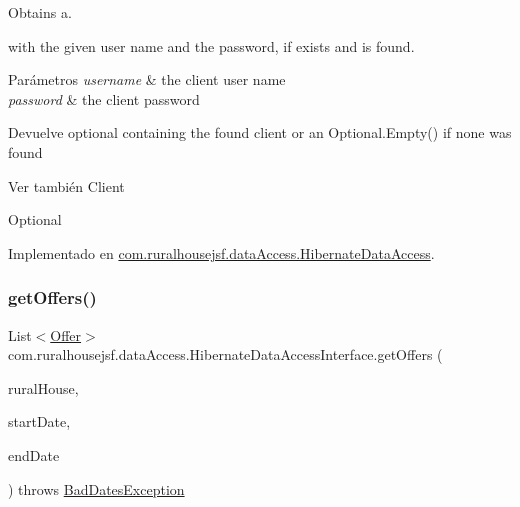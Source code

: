 Obtains a. 


\begin{DoxyCode}{0}
\end{DoxyCode}
 with the given user name and the password, if exists and is found.


\begin{DoxyParams}{Parámetros}
{\em username} & the client user name \\
\hline
{\em password} & the client password\\
\hline
\end{DoxyParams}
\begin{DoxyReturn}{Devuelve}
optional containing the found client or an {\ttfamily Optional.\+Empty()} if none was found
\end{DoxyReturn}
\begin{DoxySeeAlso}{Ver también}
Client 

Optional 
\end{DoxySeeAlso}


Implementado en \mbox{\hyperlink{classcom_1_1ruralhousejsf_1_1data_access_1_1_hibernate_data_access_a6df6a0502595b73be0f6d238743eeda5}{com.\+ruralhousejsf.\+data\+Access.\+Hibernate\+Data\+Access}}.

\mbox{\label{interfacecom_1_1ruralhousejsf_1_1data_access_1_1_hibernate_data_access_interface_a731ab9e6ef26732d453046c9630c677b}} 
\subsubsection{\texorpdfstring{getOffers()}{getOffers()}\hspace{0.1cm}{\footnotesize\ttfamily [1/2]}}
{\footnotesize\ttfamily List$<$\mbox{\hyperlink{classcom_1_1ruralhousejsf_1_1domain_1_1_offer}{Offer}}$>$ com.\+ruralhousejsf.\+data\+Access.\+Hibernate\+Data\+Access\+Interface.\+get\+Offers (\begin{DoxyParamCaption}\item[{\mbox{\hyperlink{classcom_1_1ruralhousejsf_1_1domain_1_1_rural_house}{Rural\+House}}}]{rural\+House,  }\item[{Local\+Date}]{start\+Date,  }\item[{Local\+Date}]{end\+Date }\end{DoxyParamCaption}) throws \mbox{\hyperlink{classcom_1_1ruralhousejsf_1_1exceptions_1_1_bad_dates_exception}{Bad\+Dates\+Exception}}}




